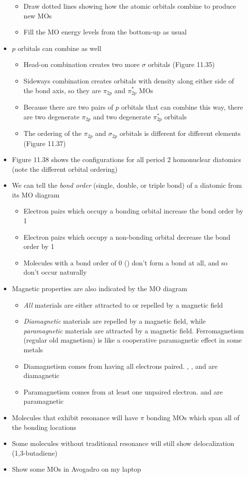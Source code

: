 \documentclass[12pt, openany, letterpaper]{memoir}
\begin{document}
\begin{itemize}
\begin{itemize}
		\item Draw dotted lines showing how the atomic orbitals combine to produce new MOs
		\item Fill the MO energy levels from the bottom-up as usual
	\end{itemize}
	\item $p$ orbitals can combine as well
	\begin{itemize}
		\item Head-on combination creates two more $\sigma$ orbitals (Figure 11.35)
		\item Sideways combination creates orbitals with density along either side of the bond axis, so they are $\pi_{2p}$ and $\pi^*_{2p}$ MOs
		\item Because there are two pairs of $p$ orbitals that can combine this way, there are two degenerate $\pi_{2p}$ and two degenerate $\pi^*_{2p}$ orbitals
		\item The ordering of the $\pi_{2p}$ and $\sigma_{2p}$ orbitals is different for different elements (Figure 11.37)
	\end{itemize}
	\item Figure 11.38 shows the configurations for all period 2 homonuclear diatomics (note the different orbital ordering)
	\item We can tell the \emph{bond order} (single, double, or triple bond) of a diatomic from its MO diagram
	\begin{itemize}
		\item Electron pairs which occupy a bonding orbital increase the bond order by 1
		\item Electron pairs which occupy a non-bonding orbital decrease the bond order by 1
		\item Molecules with a bond order of 0 () don't form a bond at all, and so don't occur naturally
	\end{itemize}
	\item Magnetic properties are also indicated by the MO diagram
	\begin{itemize}
		\item \emph{All} materials are either attracted to or repelled by a magnetic field
		\item \emph{Diamagnetic} materials are repelled by a magnetic field, while \emph{paramagnetic} materials are attracted by a magnetic field. Ferromagnetism (regular old magnetism) is like a cooperative paramagnetic effect in some metals
		\item Diamagnetism comes from having all electrons paired. , , and  are diamagnetic
		\item Paramagnetism comes from at least one unpaired electron.  and  are paramagnetic
	\end{itemize}
	\item Molecules that exhibit resonance will have $\pi$ bonding MOs which span all of the bonding locations
	\item Some molecules without traditional resonance will still show delocalization (1,3-butadiene)
	\item Show some MOs in Avogadro on my laptop
\end{itemize}
\end{document}

